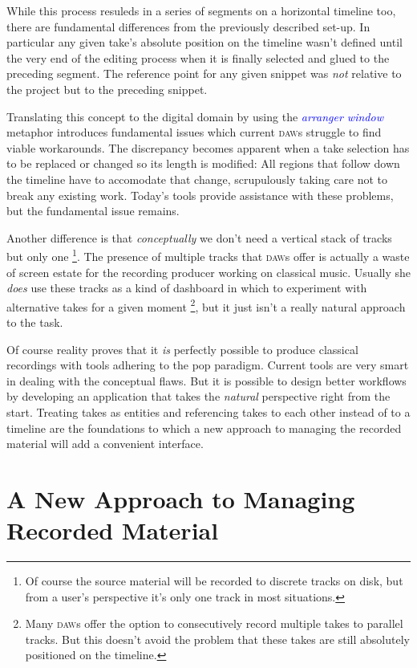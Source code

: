 \documentclass[11pt,a4paper]{article}
\newcommand*{\term}[1]{\textcolor{blue}{\emph{#1}}}
\begin{document}
While this process resuleds in a series of segments on a horizontal timeline too,
there are fundamental differences from the previously described set-up.
In particular any given take's absolute position on the timeline wasn't defined until the
very end of the editing process when it is finally selected and glued to the
preceding segment.
The reference point for any given snippet was \emph{not} relative to the project
but to the preceding snippet.

Translating this concept to the digital domain by using the \term{arranger window}
metaphor introduces fundamental issues which current \textsc{daw}s struggle to find
viable workarounds.
The discrepancy becomes apparent when a take selection has to be replaced or changed
so its length is modified: All regions that follow down the timeline have
to accomodate that change, scrupulously taking care not to break any existing work.
Today's tools provide assistance with these problems, but the fundamental
issue remains.

Another difference is that \emph{conceptually} we don't need a vertical stack of
tracks but only one%
\footnote{Of course the source material will be recorded to discrete tracks on
disk, but from a user's perspective it's only one track in most situations.}.
The presence of multiple tracks that \textsc{daw}s offer is actually a waste of
screen estate for the recording producer working on classical music.
Usually she \emph{does} use these tracks as a kind of dashboard in which to
experiment with alternative takes for a given moment%
\footnote{Many \textsc{daw}s offer the option to consecutively record multiple
takes to parallel tracks. But this doesn't avoid the problem that these takes
are still absolutely positioned on the timeline.}, but it just isn't a really
natural approach to the task.

Of course reality proves that it \emph{is} perfectly possible to produce classical
recordings with tools adhering to the pop paradigm. Current tools are very
smart in dealing with the conceptual flaws.
But it is possible to design better workflows by developing an application that
takes the \emph{natural} perspective right from the start.
Treating takes as entities and referencing takes to each other instead of to a
timeline are the foundations to which a new approach to managing the recorded
material will add a convenient interface.


\section{A New Approach to Managing Recorded Material}
\end{document}
